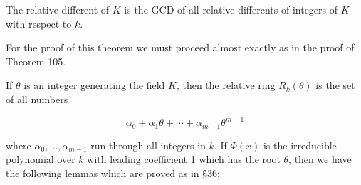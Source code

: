 The relative different of $K$ is the GCD of all relative differents of integers of $K$ with respect to $k$.

For the proof of this theorem we must proceed almost exactly as in the proof of Theorem 105.

If $\theta$ is an integer generating the field $K$, then the relative ring $R_k(\theta)$ is the set of all numbers

$$\alpha_0 + \alpha_1 \theta + \cdots + \alpha_{m-1} \theta^{m-1}$$

where $\alpha_0, \ldots, \alpha_{m-1}$ run through all integers in $k$. If $\Phi(x)$ is the irreducible polynomial over $k$ with leading coefficient 1 which has the root $\theta$, then we have the following lemmas which are proved as in §36:
